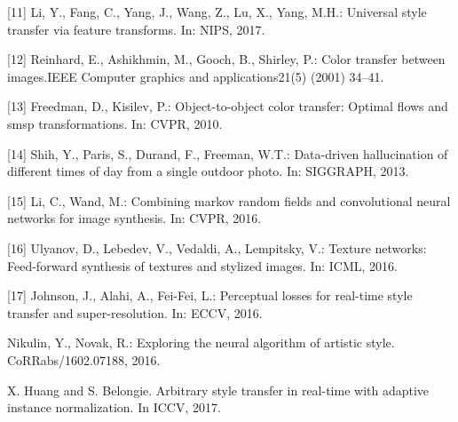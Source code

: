 \begin{thebibliography}{9}
[11] Li, Y., Fang, C., Yang, J., Wang, Z., Lu, X., Yang, M.H.:  Universal style transfer via feature transforms.  In: NIPS, 2017. 

[12] Reinhard, E., Ashikhmin, M., Gooch, B., Shirley, P.: Color transfer between images.IEEE Computer graphics and applications21(5) (2001) 34–41.

[13] Freedman, D., Kisilev, P.:  Object-to-object color transfer: Optimal flows and smsp transformations.  In: CVPR, 2010. 

[14] Shih,  Y.,  Paris,  S.,  Durand,  F.,  Freeman,  W.T.:   Data-driven  hallucination  of different times of day from a single outdoor photo.  In: SIGGRAPH, 2013.  

[15] Li,  C.,  Wand,  M.:   Combining  markov  random  fields  and  convolutional  neural networks for image synthesis.  In: CVPR, 2016. 

[16] Ulyanov, D., Lebedev, V., Vedaldi, A., Lempitsky, V.:  Texture networks: Feed-forward synthesis of textures and stylized images.  In: ICML, 2016.

[17] Johnson, J., Alahi, A., Fei-Fei, L.:  Perceptual losses for real-time style transfer and super-resolution.  In: ECCV, 2016.

Nikulin,  Y.,  Novak,  R.:  Exploring  the  neural  algorithm  of  artistic  style.  CoRRabs/1602.07188, 2016.

X. Huang and S. Belongie. Arbitrary style transfer in real-time with adaptive instance normalization. In
ICCV, 2017.
\end{thebibliography}